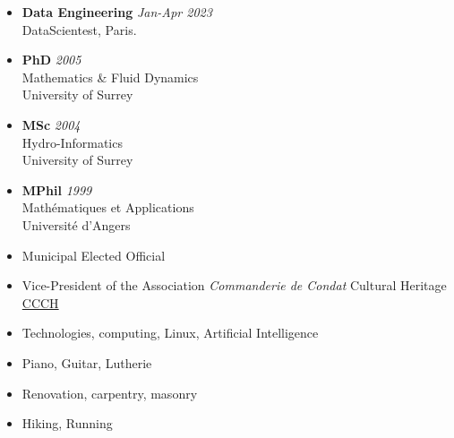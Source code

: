 \documentclass[11 pt,oneside,a4paper,titlepage]{article}
\begin{document}
{\begin{minipage}{6.3cm}
        \begin{itemize}[leftmargin=*]
            \item {\textbf{Data Engineering} \textit{Jan-Apr 2023}\\
                  DataScientest, Paris.}
            \item {\textbf{PhD} \textit{2005} \\
                  Mathematics \& Fluid Dynamics\\
                  University of Surrey}
            \item {\textbf{MSc} \textit{2004} \\
                  Hydro-Informatics\\
                  University of Surrey}
                  \item{\textbf{MPhil} \textit{1999} \\
                              Mathématiques et Applications\\
                              Université d'Angers}
        \end{itemize}

        \begin{itemize}[leftmargin=*]
            \item{Municipal Elected Official}
            \item{Vice-President of the Association \textit{Commanderie de Condat} Cultural Heritage \href{https://commanderiecondat.fr/}{CCCH}}
            \item{Technologies, computing, Linux, Artificial Intelligence}
            \item{Piano, Guitar, Lutherie}
            \item{Renovation, carpentry, masonry}
            \item{Hiking, Running}
        \end{itemize}
    \end{minipage}} %
\hfill
\end{document}
